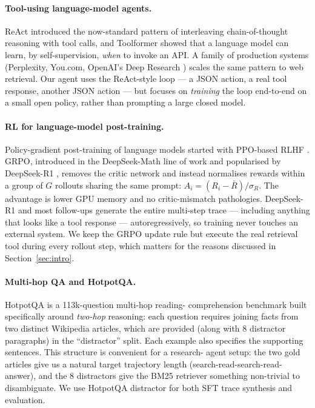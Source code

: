 \documentclass[11pt]{article}
\begin{document}
\paragraph{Tool-using language-model agents.}
ReAct \cite{react} introduced the now-standard pattern of
interleaving chain-of-thought reasoning with tool calls, and Toolformer
\cite{toolformer} showed that a language model can learn, by
self-supervision, \emph{when} to invoke an API. A family of production
systems (Perplexity, You.com, OpenAI's Deep Research
\cite{deep-research}) scales the same pattern to web retrieval. Our
agent uses the ReAct-style loop --- a JSON action, a real tool response,
another JSON action --- but focuses on \emph{training} the loop end-to-end
on a small open policy, rather than prompting a large closed model.

\paragraph{RL for language-model post-training.}
Policy-gradient post-training of language models started with PPO-based
RLHF \cite{rlhf-instructgpt}. GRPO, introduced in the DeepSeek-Math
line of work and popularised by DeepSeek-R1 \cite{deepseek-r1},
removes the critic network and instead normalises rewards within a group
of $G$ rollouts sharing the same prompt:
$A_i = (R_i - \bar R) / \sigma_R$. The advantage is lower GPU memory and
no critic-mismatch pathologies. DeepSeek-R1 and most follow-ups generate
the entire multi-step trace --- including anything that looks like a
tool response --- autoregressively, so training never touches an
external system. We keep the GRPO update rule but execute the real
retrieval tool during every rollout step, which matters for the reasons
discussed in Section~\ref{sec:intro}.

\paragraph{Multi-hop QA and HotpotQA.}
HotpotQA \cite{hotpotqa} is a 113k-question multi-hop reading-
comprehension benchmark built specifically around \emph{two-hop}
reasoning: each question requires joining facts from two distinct
Wikipedia articles, which are provided (along with 8 distractor
paragraphs) in the ``distractor'' split. Each example also specifies
the supporting sentences. This structure is convenient for a research-
agent setup: the two gold articles give us a natural target trajectory
length (search-read-search-read-answer), and the 8 distractors give the
BM25 retriever something non-trivial to disambiguate. We use HotpotQA
distractor for both SFT trace synthesis and evaluation.
\end{document}
